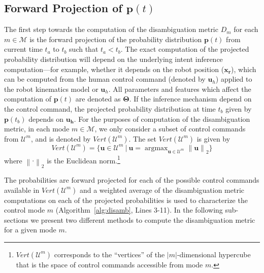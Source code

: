 \documentclass[conference]{IEEEtran}
\DeclareMathOperator*{\argmax}{argmax}
\newcommand{\norm}[1]{\left\lVert#1\right\rVert}
\begin{document}
\subsection{Forward Projection of $\boldsymbol{p}(t)$}
The first step towards the computation of the disambiguation metric $D_m$ for each $m \in \mathcal{M}$ is the forward projection of the probability distribution $\boldsymbol{p}(t)$ from current time $t_a$ to $t_b$ such that $t_a < t_b$. The exact computation of the projected probability distribution will depend on the underlying intent inference computation---for example, whether it depends on the robot position ($\boldsymbol{x_r}$), which can be computed from the human control command (denoted by $\boldsymbol{u}_h$) applied to the robot kinematics model or $\boldsymbol{u}_h$. All parameters and features which affect the computation of $\boldsymbol{p}(t)$ are denoted as $\boldsymbol{\Theta}$. If the inference mechanism depend on the control command, the projected probability distribution at time $t_b$ given by $\boldsymbol{p}(t_b)$ depends on $\boldsymbol{u_h}$. For the purposes of computation of the disambiguation metric, in each mode $m \in \mathcal{M}$, we only consider a subset of control commands from $\mathcal{U}^m$, and is denoted by $Vert(\mathcal{U}^m)$. The set $Vert(\mathcal{U}^m)$ is given by
\begin{equation*}
Vert(\mathcal{U}^m) = \{\boldsymbol{u} \in \mathcal{U}^m ~|~ \boldsymbol{u} = \argmax_{\boldsymbol{u} \in \mathcal{U}^m} \norm{\boldsymbol{u}}_{2}\}
\end{equation*}
where $\norm{\cdot}_2$ is the Euclidean norm.\footnote{$Vert(\mathcal{U}^m)$ corresponds to the ``vertices'' of the $|m|$-dimensional hypercube that is the space of control commands accessible from mode $m$.} 

The probabilities are forward projected for each of the possible control commands available in $Vert(\mathcal{U}^m)$ and a weighted average of the disambiguation metric computations on each of the projected probabilities is used to characterize the control mode $m$ (Algorithm~\ref{alg:disamb}, Lines 3-11). In the following sub-sections we present two different methods to compute the disambiguation metric for a given mode $m$. 
\end{document}
